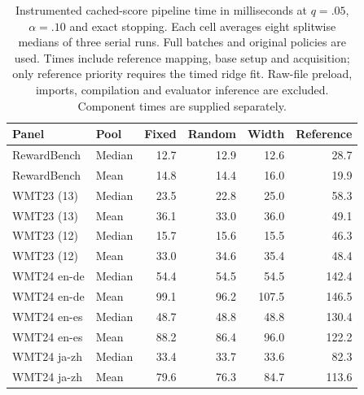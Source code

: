 \begin{table}[t]
\centering\small
\begin{tabular}{llrrrr}
\toprule
Panel & Pool & Fixed & Random & Width & Reference \\
\midrule
RewardBench & Median & 12.7 & 12.9 & 12.6 & 28.7 \\
RewardBench & Mean & 14.8 & 14.4 & 16.0 & 19.9 \\
WMT23 (13) & Median & 23.5 & 22.8 & 25.0 & 58.3 \\
WMT23 (13) & Mean & 36.1 & 33.0 & 36.0 & 49.1 \\
WMT23 (12) & Median & 15.7 & 15.6 & 15.5 & 46.3 \\
WMT23 (12) & Mean & 33.0 & 34.6 & 35.4 & 48.4 \\
WMT24 en-de & Median & 54.4 & 54.5 & 54.5 & 142.4 \\
WMT24 en-de & Mean & 99.1 & 96.2 & 107.5 & 146.5 \\
WMT24 en-es & Median & 48.7 & 48.8 & 48.8 & 130.4 \\
WMT24 en-es & Mean & 88.2 & 86.4 & 96.0 & 122.2 \\
WMT24 ja-zh & Median & 33.4 & 33.7 & 33.6 & 82.3 \\
WMT24 ja-zh & Mean & 79.6 & 76.3 & 84.7 & 113.6 \\
\bottomrule
\end{tabular}
\caption{Instrumented cached-score pipeline time in milliseconds at $q=.05$, $\alpha=.10$ and exact stopping. Each cell averages eight splitwise medians of three serial runs. Full batches and original policies are used. Times include reference mapping, base setup and acquisition; only reference priority requires the timed ridge fit. Raw-file preload, imports, compilation and evaluator inference are excluded. Component times are supplied separately.}
\label{tab:cached-pipeline-timing}
\end{table}
